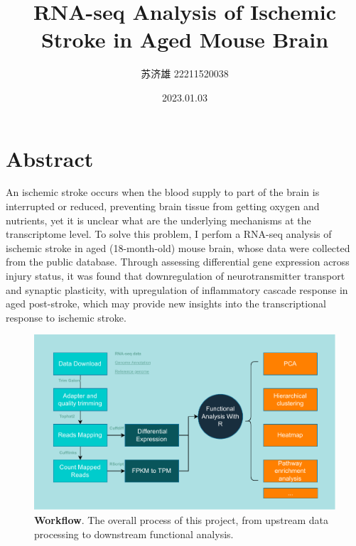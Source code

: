 \documentclass[
  a4paper,
]{article}
\title{RNA-seq Analysis of Ischemic Stroke in Aged Mouse Brain}
\author{苏济雄 22211520038}
\date{2023.01.03}
\renewcommand*\contentsname{Table of contents}
\newcommand\contentsname{Table of contents}
\begin{document}
\maketitle
\ifdefined\Shaded\renewenvironment{Shaded}{\begin{tcolorbox}[colback={shadecolor}, breakable, frame hidden, enhanced, boxrule=0pt]}{\end{tcolorbox}}\fi

\renewcommand*\contentsname{Contents}
{
\hypersetup{linkcolor=}
\setcounter{tocdepth}{3}
\tableofcontents
}
\hypertarget{abstract}{%
\section{Abstract}\label{abstract}}

An ischemic stroke occurs when the blood supply to part of the brain is
interrupted or reduced, preventing brain tissue from getting oxygen and
nutrients, yet it is unclear what are the underlying mechanisms at the
transcriptome level. To solve this problem, I perfom a RNA-seq analysis
of ischemic stroke in aged (18-month-old) mouse brain, whose data were
collected from the public database. Through assessing differential gene
expression across injury status, it was found that downregulation of
neurotransmitter transport and synaptic plasticity, with upregulation of
inflammatory cascade response in aged post-stroke, which may provide new
insights into the transcriptional response to ischemic stroke.

\begin{figure}[H]

{\centering \includegraphics{./figure/Figure-1.pipeline.pdf}

}

\caption{\textbf{Workflow}. The overall process of this project, from
upstream data processing to downstream functional analysis.}

\end{figure}
\end{document}

